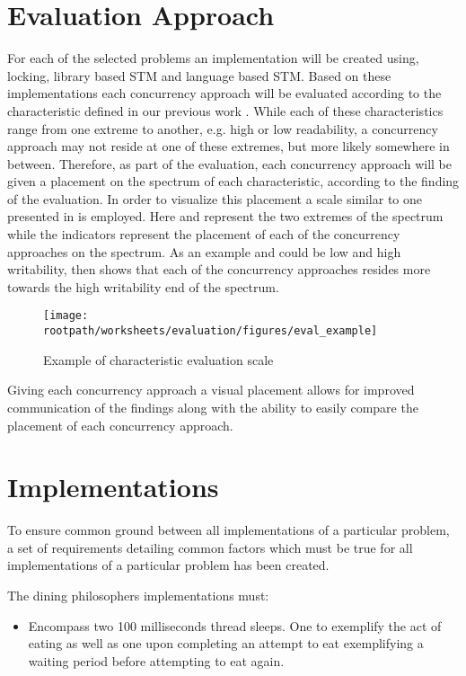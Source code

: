 \section{Evaluation Approach}
For each of the selected problems an implementation will be created using, locking, library based \ac{STM} and language based \ac{STM}. Based on these implementations each concurrency approach will be evaluated according to the characteristic defined in our previous work 
\cite[p. 15-21]{dpt907e14trending}. While each of these characteristics range from one extreme to another, e.g. high or low readability, a concurrency approach may not reside at one of these extremes, but more likely somewhere in between. Therefore, as part of the evaluation, each concurrency approach will be given a placement on the spectrum of each characteristic, according to the finding of the evaluation. In order to visualize this placement a scale similar to one presented in  is employed. Here  and  represent the two extremes of the spectrum while the indicators represent the placement of each of the concurrency approaches on the spectrum. As an example  and  could be low and high writability,  then shows that each of the concurrency approaches resides more towards the high writability end of the spectrum.
\begin{figure}[ht!]
\centering
\texttt{[image: \\rootpath/worksheets/evaluation/figures/eval\_example]}
\caption{Example of characteristic evaluation scale}\label{fig:evel_example}
\end{figure}
Giving each concurrency approach a visual placement allows for improved communication of the findings along with the ability to easily compare the placement of each concurrency approach.

\section{Implementations}
To ensure common ground between all implementations of a particular problem, a set of requirements detailing common factors which must be true for all implementations of a particular problem has been created.

The dining philosophers implementations must:
\begin{itemize}
	\item Encompass two 100 milliseconds thread sleeps. One to exemplify the act of eating as well as one upon completing an attempt to eat exemplifying a waiting period before attempting to eat again.
\end{itemize}


